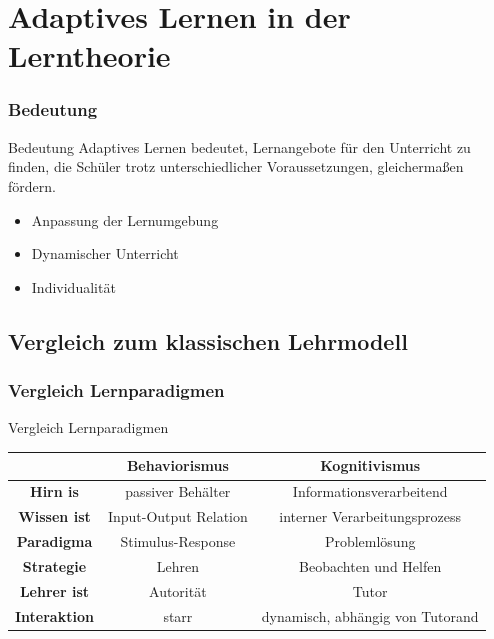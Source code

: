 \documentclass{beamer}
\begin{document}
\section{Adaptives Lernen in der Lerntheorie}
  \begin{frame}
    \frametitle{Bedeutung}
    \begin{block}{Bedeutung}
      Adaptives Lernen bedeutet, Lernangebote für den Unterricht zu finden, die Schüler trotz unterschiedlicher Voraussetzungen, gleichermaßen fördern.
    \end{block}

    \centering
    \begin{itemize}
      \item Anpassung der Lernumgebung
      \item Dynamischer Unterricht
      \item Individualität
    \end{itemize}
  \end{frame}
\subsection{Vergleich zum klassischen Lehrmodell}
  \begin{frame}
   \frametitle{Vergleich Lernparadigmen}
   \begin{block}{Vergleich Lernparadigmen}
      \begin{table}[!htbp]
        \centering
        \begin{tabular}{c || c | c}
          \hline
          \  & \textbf{Behaviorismus} & \textbf{Kognitivismus} \\
          \hline
          \textbf{Hirn is} & passiver Behälter & Informationsverarbeitend \\
          \textbf{Wissen ist} & Input-Output Relation & interner Verarbeitungsprozess \\
          \textbf{Paradigma} & Stimulus-Response & Problemlösung  \\
          \textbf{Strategie} & Lehren & Beobachten und Helfen \\
          \textbf{Lehrer ist} & Autorität & Tutor \\
          \textbf{Interaktion} & starr & dynamisch, abhängig von Tutorand \\
        \end{tabular}
      \end{table}
   \end{block}
  \end{frame}
\end{document}
